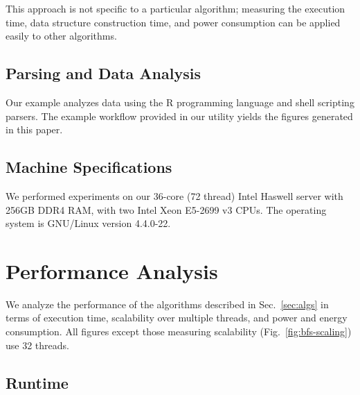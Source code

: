 \documentclass[conference]{IEEEtran}
\begin{document}
This approach is not specific to a particular algorithm; measuring the execution time, data structure construction time, and power consumption can be applied easily to other algorithms.

\subsection{Parsing and Data Analysis}
Our example analyzes data using the R programming language and shell scripting parsers. The example workflow provided in our utility yields the figures generated in this paper.

\subsection{Machine Specifications}
We performed experiments on our 36-core (72 thread) Intel Haswell server with 256GB DDR4 RAM, with two Intel Xeon E5-2699 v3 CPUs. The operating system is GNU/Linux version 4.4.0-22.

\section{Performance Analysis}\label{sec:perf}

We analyze the performance of the algorithms described in Sec.~\ref{sec:algs} in terms of execution time, scalability over multiple threads, and power and energy consumption. All figures except those measuring scalability (Fig.~\ref{fig:bfs-scaling}) use 32 threads.

\subsection{Runtime}
\end{document}
